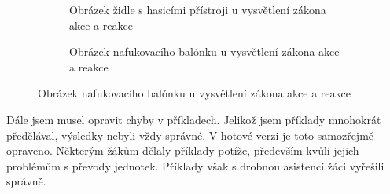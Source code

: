 \begin{figure}[H]
    \begingroup
    \makeatletter
    \renewcommand\thesubfigure{\thefigure~--~\@nameuse{subfiglabel@\alph{subfigure}}}
    \newcommand{\subfiglabel@a}{vlevo}
    \newcommand{\subfiglabel@b}{vpravo}
    \captionsetup[subfigure]{labelformat=simple, labelsep=colon}
    \renewcommand\p@subfigure{}
    \makeatother
    \begin{subfigure}{0.47\textwidth}
        \centering
        \setlength{\fboxsep}{0pt}
        \caption{Obrázek židle s hasicími přístroji u vysvětlení zákona akce a reakce \jaObr}
        \label{obr:zidlePrezentace}
    \end{subfigure}\hfill
    \begin{subfigure}{0.47\textwidth}
        \centering
        \setlength{\fboxsep}{0pt}
        \caption{Obrázek nafukovacího balónku u vysvětlení zákona akce a reakce \jaObr}
        \label{obr:balonekPrezentace}
    \end{subfigure}
    \endgroup
\end{figure}
{Dále jsem musel opravit chyby v příkladech. Jelikož jsem příklady mnohokrát předělával, výsledky nebyli vždy správné. V hotové verzi je toto samozřejmě opraveno. Některým žákům dělaly příklady potíže, především kvůli jejich problémům s převody jednotek. Příklady však s drobnou asistencí žáci vyřešili správně.}
\newpage
